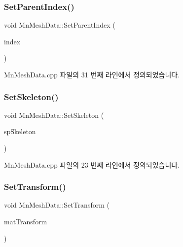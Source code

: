 \subsubsection{\texorpdfstring{Set\+Parent\+Index()}{SetParentIndex()}}
{\footnotesize\ttfamily void Mn\+Mesh\+Data\+::\+Set\+Parent\+Index (\begin{DoxyParamCaption}\item[{U\+I\+NT}]{index }\end{DoxyParamCaption})}



Mn\+Mesh\+Data.\+cpp 파일의 31 번째 라인에서 정의되었습니다.

\mbox{\label{class_m_n_l_1_1_mn_mesh_data_a6de0a715ac6d275ebfee31ef6d7e2542}} 
\subsubsection{\texorpdfstring{Set\+Skeleton()}{SetSkeleton()}}
{\footnotesize\ttfamily void Mn\+Mesh\+Data\+::\+Set\+Skeleton (\begin{DoxyParamCaption}\item[{const std\+::shared\+\_\+ptr$<$ \hyperlink{class_m_n_l_1_1_mn_skeleton}{Mn\+Skeleton} $>$}]{sp\+Skeleton }\end{DoxyParamCaption})}



Mn\+Mesh\+Data.\+cpp 파일의 23 번째 라인에서 정의되었습니다.

\mbox{\label{class_m_n_l_1_1_mn_mesh_data_a695340ddfdbf11ba947928702cab7d78}} 
\subsubsection{\texorpdfstring{Set\+Transform()}{SetTransform()}}
{\footnotesize\ttfamily void Mn\+Mesh\+Data\+::\+Set\+Transform (\begin{DoxyParamCaption}\item[{const Direct\+X\+::\+Simple\+Math\+::\+Matrix \&}]{mat\+Transform }\end{DoxyParamCaption})}



